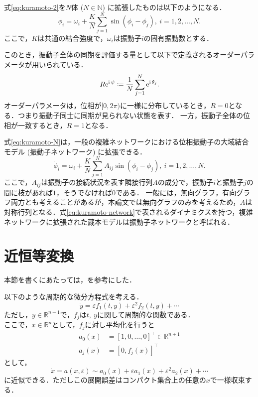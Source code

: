 \documentclass[../main]{subfiles}
\begin{document}
式\eqref{eq:kuramoto-2}を$N$体 ($N\in\mathbb{N}$) に拡張したものは以下のようになる．
\begin{equation}
    \label{eq:kuramoto-N}
    \dot{\phi}_i=\omega_i+\frac{K}{N}\sum_{j=1}^N\sin(\phi_i-\phi_j),\ i=1,2,\ldots,N.
\end{equation}
ここで，$K$は共通の結合強度で，$\omega_i$は振動子$i$の固有振動数とする．

このとき，振動子全体の同期を評価する量として以下で定義されるオーダーパラメータが用いられている．
\begin{equation}
    R\mathrm{e}^{{\mathrm i\,} \psi}\coloneqq\frac{1}{N}\sum_{j=1}^N\mathrm{e}^{{\mathrm i\,} \theta_j}.    
\end{equation}
オーダーパラメータは，位相が$[0,2\pi)$に一様に分布しているとき，$R= 0$となる．つまり振動子同士に同期が見られない状態を表す．
一方，振動子全体の位相が一致するとき，$R=1$となる．

式\eqref{eq:kuramoto-N}は，一般の複雑ネットワークにおける位相振動子の大域結合モデル (振動子ネットワーク) に拡張できる．
\begin{equation}
    \label{eq:kuramoto-network}
    \dot{\phi}_i=\omega_i+\frac{K}{N}\sum_{j=1}^NA_{ij}\sin(\phi_i-\phi_j),\ i=1,2,\ldots,N.
\end{equation}
ここで，$A_{ij}$は振動子の接続状況を表す隣接行列$A$の成分で，振動子$i$と振動子$j$の間に枝があれば$1$，そうでなければ$0$である．
一般には，無向グラフ，有向グラフ両方とも考えることがあるが，本論文では無向グラフのみを考えるため，$A$は対称行列となる．式\eqref{eq:kuramoto-network}で表されるダイナミクスを持つ，複雑ネットワークに拡張された蔵本モデルは振動子ネットワークと呼ばれる．
\section{近恒等変換}
本節を書くにあたっては，\cite{james2003}を参考にした．

以下のような周期的な微分方程式を考える．
\begin{equation}
    \dot{y}=\varepsilon f_1(t,y)+\varepsilon^2f_2(t,y)+\cdots
\end{equation}
ただし，$y\in\mathbb{R}^{n-1}$で，$f_j$は$t,\ y$に関して周期的な関数である．\\
ここで，$x\in\mathbb{R}^{n}$として，$f_j$に対し平均化を行うと
\begin{align}
    a_0(x)&=[1,0,\ldots,0]^\top\in\mathbb{R}^{n+1}\\
    a_j(x)&=[0,f_j(x)]^\top
\end{align}
として，
\begin{equation}
    \dot{x}=a(x,\varepsilon)\sim a_0(x)+\varepsilon a_1(x)+\varepsilon^2 a_2(x)+\cdots
\end{equation}
に近似できる．ただしこの展開誤差はコンパクト集合上の任意の$x$で一様収束する．
\end{document}
